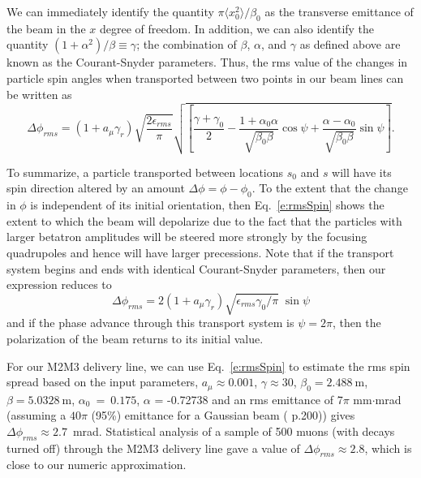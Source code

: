 \documentclass[12pt]{article}
\begin{document}
We can immediately identify the quantity $\pi \langle x_0^2\rangle/\beta_0$ as the transverse emittance of the beam in the $x$ degree of freedom.  In addition, we can also identify the quantity $(1+\alpha^2)/\beta \equiv \gamma$; the combination of $\beta$, $\alpha$, and $\gamma$ as defined above are known as the Courant-Snyder parameters.\cite{Courant}  Thus, the rms value of the changes in particle spin angles when transported between two points in our beam lines can be written as
\begin{equation}
\Delta \phi_{rms} = (1 + a_{\mu} \gamma_r) \sqrt{\frac{2 \epsilon_{rms}}{\pi}} \sqrt{\left[  \frac{\gamma + \gamma_0}{2} - \frac{1 + \alpha_0 \alpha}{\sqrt{\beta_0 \beta}} \cos \psi + \frac{\alpha - \alpha_0}{\sqrt{\beta_0 \beta}} \sin \psi \right]}.
\label{e:rmsSpin}
\end{equation}

To summarize, a particle transported between locations $s_0$ and $s$ will have its spin direction altered by an amount $\Delta \phi = \phi-\phi_0$.  To the extent that the change in $\phi$ is independent of its initial orientation, then Eq.~\ref{e:rmsSpin} shows the extent to which the beam will depolarize due to the fact that the particles with larger betatron amplitudes will be steered more strongly by the focusing quadrupoles and hence will have larger precessions.  Note that if the transport system begins and ends with identical Courant-Snyder parameters, then our expression reduces to 
\begin{equation}
\Delta\phi_{rms} = 2(1+a_\mu\gamma_r)\sqrt{\epsilon_{rms}\gamma_0/\pi} \;\sin\psi
\end{equation}
and if the phase advance through this transport system is $\psi = 2\pi$, then the polarization of the beam returns to its initial value.

For our M2M3 delivery line, we can use Eq.~\ref{e:rmsSpin} to estimate the rms spin spread based on the input parameters, $a_\mu \approx 0.001$, $\gamma \approx 30$, $\beta_0 = 2.488~$m, $\beta = 5.0328~$m, $\alpha_0~=~0.175$, $\alpha$ = -0.72738 and an rms emittance of 7$\pi$ mm$\cdot$mrad (assuming a $40\pi$ (95\%) emittance for a Gaussian beam (\cite{TDR} p.200)) gives $\Delta \phi_{rms} \approx 2.7$~mrad. Statistical analysis of a sample of 500 muons (with decays turned off) through the M2M3 delivery line gave a value of $\Delta \phi_{rms} \approx 2.8$, which is close to our numeric approximation. 
\end{document}

